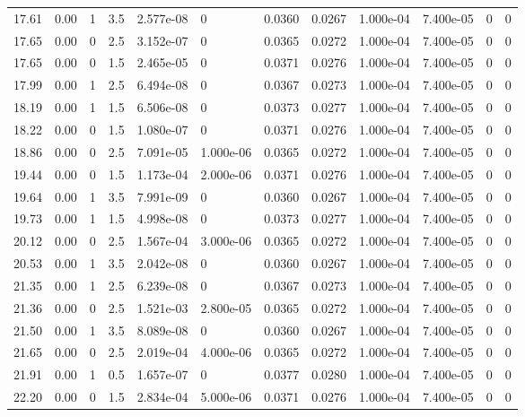 \documentclass[preview]{standalone}
\begin{document}
{{{\begin{tabular}{L{1.2cm}C{1.2cm} C{0.3cm}C{0.5cm} C{1.4cm}C{1.4cm} C{1.4cm}C{1.4cm} C{1.6cm}C{1.6cm} C{1.6cm}C{1.6cm}}
  17.61  &  0.00  & 1     & 3.5 &  2.577e-08  & 0  &  0.0360&   0.0267& 1.000e-04 & 7.400e-05   &  0 & 0  \\ 
  17.65  &  0.00  & 0     & 2.5 &  3.152e-07  & 0  &  0.0365&   0.0272& 1.000e-04 & 7.400e-05   &  0 & 0  \\ 
  17.65  &  0.00  & 0     & 1.5 &  2.465e-05  & 0  &  0.0371&   0.0276& 1.000e-04 & 7.400e-05   &  0 & 0  \\ 
  17.99  &  0.00  & 1     & 2.5 &  6.494e-08  & 0  &  0.0367&   0.0273& 1.000e-04 & 7.400e-05   &  0 & 0  \\ 
  18.19  &  0.00  & 1     & 1.5 &  6.506e-08  & 0  &  0.0373&   0.0277& 1.000e-04 & 7.400e-05   &  0 & 0  \\ 
  18.22  &  0.00  & 0     & 1.5 &  1.080e-07  & 0  &  0.0371&   0.0276& 1.000e-04 & 7.400e-05   &  0 & 0  \\ 
  18.86  &  0.00  & 0     & 2.5 &  7.091e-05  & 1.000e-06  &  0.0365&   0.0272& 1.000e-04 & 7.400e-05   &  0 & 0  \\ 
  19.44  &  0.00  & 0     & 1.5 &  1.173e-04  & 2.000e-06  &  0.0371&   0.0276& 1.000e-04 & 7.400e-05   &  0 & 0  \\ 
  19.64  &  0.00  & 1     & 3.5 &  7.991e-09  & 0  &  0.0360&   0.0267& 1.000e-04 & 7.400e-05   &  0 & 0  \\ 
  19.73  &  0.00  & 1     & 1.5 &  4.998e-08  & 0  &  0.0373&   0.0277& 1.000e-04 & 7.400e-05   &  0 & 0  \\ 
  20.12  &  0.00  & 0     & 2.5 &  1.567e-04  & 3.000e-06  &  0.0365&   0.0272& 1.000e-04 & 7.400e-05   &  0 & 0  \\ 
  20.53  &  0.00  & 1     & 3.5 &  2.042e-08  & 0  &  0.0360&   0.0267& 1.000e-04 & 7.400e-05   &  0 & 0  \\ 
  21.35  &  0.00  & 1     & 2.5 &  6.239e-08  & 0  &  0.0367&   0.0273& 1.000e-04 & 7.400e-05   &  0 & 0  \\ 
  21.36  &  0.00  & 0     & 2.5 &  1.521e-03  & 2.800e-05  &  0.0365&   0.0272& 1.000e-04 & 7.400e-05   &  0 & 0  \\ 
  21.50  &  0.00  & 1     & 3.5 &  8.089e-08  & 0  &  0.0360&   0.0267& 1.000e-04 & 7.400e-05   &  0 & 0  \\ 
  21.65  &  0.00  & 0     & 2.5 &  2.019e-04  & 4.000e-06  &  0.0365&   0.0272& 1.000e-04 & 7.400e-05   &  0 & 0  \\ 
  21.91  &  0.00  & 1     & 0.5 &  1.657e-07  & 0  &  0.0377&   0.0280& 1.000e-04 & 7.400e-05   &  0 & 0  \\ 
  22.20  &  0.00  & 0     & 1.5 &  2.834e-04  & 5.000e-06  &  0.0371&   0.0276& 1.000e-04 & 7.400e-05   &  0 & 0  \\ 

\end{tabular}}}}
\end{document}
